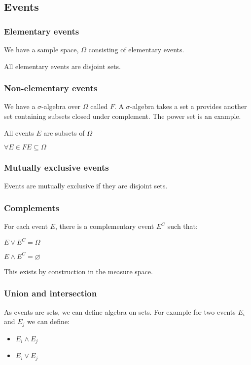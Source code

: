 
\subsection{Events}

\subsubsection{Elementary events}

We have a sample space, \(\Omega \) consisting of elementary events.

All elementary events are disjoint sets.

\subsubsection{Non-elementary events}

We have a \(\sigma\)-algebra over \(\Omega \) called \(F\). A \(\sigma\)-algebra takes a set a provides another set containing subsets closed under complement. The power set is an example.

All events \(E\) are subsets of \(\Omega\)

\(\forall E\in F E\subseteq \Omega\)

\subsubsection{Mutually exclusive events}

Events are mutually exclusive if they are disjoint sets.

\subsubsection{Complements}

For each event \(E\), there is a complementary event \(E^C\) such that:

$E\lor E^C=\Omega$

$E\land E^C=\varnothing$

This exists by construction in the measure space.

\subsubsection{Union and intersection}

As events are sets, we can define algebra on sets. For example for two events \(E_i\) and \(E_j\) we can define:

\begin{itemize}
\item \(E_i\land E_j\)
\item \(E_i\lor E_j\)
\end{itemize}

